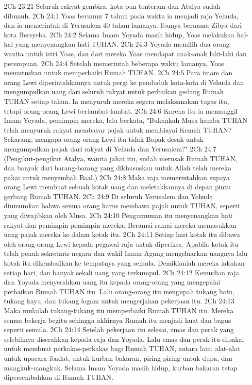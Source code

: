 2Ch 23:21  Seluruh rakyat gembira, kota pun tenteram dan Atalya sudah dibunuh.
2Ch 24:1  Yoas berumur 7 tahun pada waktu ia menjadi raja Yehuda, dan ia memerintah di Yerusalem 40 tahun lamanya. Ibunya bernama Zibya dari kota Bersyeba.
2Ch 24:2  Selama Imam Yoyada masih hidup, Yoas melakukan hal-hal yang menyenangkan hati TUHAN.
2Ch 24:3  Yoyada memilih dua orang wanita untuk istri Yoas, dan dari mereka Yoas mendapat anak-anak laki-laki dan perempuan.
2Ch 24:4  Setelah memerintah beberapa waktu lamanya, Yoas memutuskan untuk memperbaiki Rumah TUHAN.
2Ch 24:5  Para imam dan orang Lewi diperintahkannya untuk pergi ke penduduk kota-kota di Yehuda dan mengumpulkan uang dari seluruh rakyat untuk perbaikan gedung Rumah TUHAN setiap tahun. Ia menyuruh mereka segera melaksanakan tugas itu, tetapi orang-orang Lewi berlambat-lambat.
2Ch 24:6  Karena itu ia memanggil Imam Yoyada, pemimpin mereka, lalu berkata, "Bukankah Musa hamba TUHAN telah menyuruh rakyat membayar pajak untuk membiayai Kemah TUHAN? Sekarang, mengapa orang-orang Lewi itu tidak Bapak desak untuk mengumpulkan pajak dari rakyat di Yehuda dan Yerusalem?"
2Ch 24:7  (Pengikut-pengikut Atalya, wanita jahat itu, sudah merusak Rumah TUHAN, dan banyak dari barang-barang yang dikhususkan untuk Allah telah mereka pakai untuk menyembah Baal.)
2Ch 24:8  Maka raja memerintahkan supaya orang Lewi membuat sebuah kotak uang dan meletakkannya di depan pintu gerbang Rumah TUHAN.
2Ch 24:9  Di seluruh Yerusalem dan Yehuda diumumkan bahwa semua orang harus membawa pajak untuk TUHAN, seperti yang diwajibkan oleh Musa.
2Ch 24:10  Pengumuman itu menyenangkan hati rakyat dan pemimpin-pemimpin mereka. Beramai-ramai mereka memasukkan uang pajak mereka ke dalam kotak itu.
2Ch 24:11  Setiap hari kotak itu dibawa oleh orang-orang Lewi kepada pegawai raja untuk diperiksa. Apabila kotak itu telah penuh sekretaris negara dan wakil Imam Agung mengeluarkan uangnya lalu kotak itu dikembalikan ke tempatnya yang semula. Demikianlah mereka lakukan setiap hari, dan banyak sekali uang yang terkumpul.
2Ch 24:12  Kemudian raja dan Yoyada menyerahkan uang itu kepada orang-orang yang mengepalai perbaikan Rumah TUHAN itu. Lalu orang-orang itu mengupah tukang batu, tukang kayu, dan tukang logam untuk mengerjakan pekerjaan itu.
2Ch 24:13  Maka mulailah tukang-tukang itu memperbaiki Rumah TUHAN itu. Mereka semua bekerja begitu sehingga akhirnya Rumah itu menjadi kuat dan bagus seperti semula.
2Ch 24:14  Setelah pekerjaan itu selesai, emas dan perak yang selebihnya diserahkan kepada raja dan Yoyada. Lalu emas dan perak itu dipakai untuk membuat perkakas-perkakas bagi Rumah TUHAN, antara lain: alat-alat untuk upacara ibadat, untuk kurban bakaran, piring-piring untuk dupa, dan mangkuk-mangkuk. Selama Imam Yoyada masih hidup, kurban bakaran tetap dipersembahkan di Rumah TUHAN.
